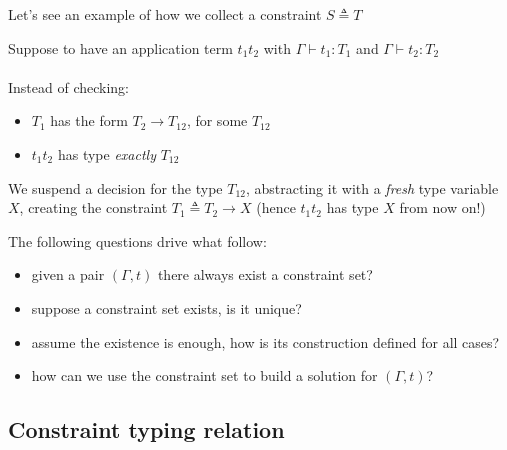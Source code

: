 \documentclass[8pt]{beamer}
\begin{document}
\begin{frame}
    Let's see an example of how we collect a constraint $S \triangleq T$
    \begin{example}
        Suppose to have an application term $t_1 t_2$ with $\Gamma \vdash t_1 : T_1$
        and $\Gamma \vdash t_2 : T_2$ \\~\\
        Instead of checking:
        \begin{itemize}
            \item $T_1$ has the form $T_2 \rightarrow T_{12}$, for some $T_{12}$
            \item $t_1 t_2$ has type \emph{exactly} $T_{12}$
        \end{itemize}
        We suspend a decision for the type $T_{12}$, abstracting it with a 
        \emph{fresh} type variable $X$, creating the constraint 
        $T_1 \triangleq T_2 \rightarrow X$ (hence $t_1 t_2$
        has type $X$ from now on!)
    \end{example}
    \pause
    The following questions drive what follow:
    \begin{itemize}
        \item given a pair $(\Gamma, t)$ there always exist a constraint set?
        \item suppose a constraint set exists, is it unique?
        \item assume the existence is enough, how is its construction defined
                for all cases?
        \item how can we use the constraint set to build a solution for $(\Gamma, t)$?
    \end{itemize}
\end{frame}

\subsection{Constraint typing relation}
\end{document}
